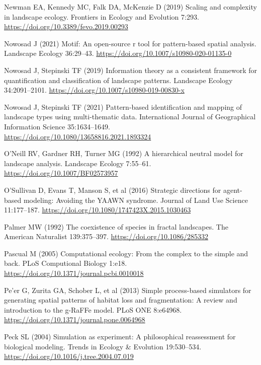 \documentclass[
  10pt,
  a4paperpaper,
]{article}
\newlength{\cslhangindent}
\newenvironment{CSLReferences}[2] %
 {\begin{list}{}{%
  \setlength{\itemindent}{0pt}
  \setlength{\leftmargin}{0pt}
  \setlength{\parsep}{0pt}
  \ifodd #1
   \setlength{\leftmargin}{\cslhangindent}
   \setlength{\itemindent}{-1\cslhangindent}
  \fi
  \setlength{\itemsep}{#2\baselineskip}}}
 {\end{list}}
\begin{document}
\begin{CSLReferences}{1}{1}
Newman EA, Kennedy MC, Falk DA, McKenzie D (2019) Scaling and complexity
in landscape ecology. Frontiers in Ecology and Evolution 7:293.
\url{https://doi.org/10.3389/fevo.2019.00293}

Nowosad J (2021) Motif: An open-source r tool for pattern-based spatial
analysis. Landscape Ecology 36:29--43.
\url{https://doi.org/10.1007/s10980-020-01135-0}

Nowosad J, Stepinski TF (2019) Information theory as a consistent
framework for quantification and classification of landscape patterns.
Landscape Ecology 34:2091--2101.
\url{https://doi.org/10.1007/s10980-019-00830-x}

Nowosad J, Stepinski TF (2021) Pattern-based identification and mapping
of landscape types using multi-thematic data. International Journal of
Geographical Information Science 35:1634--1649.
\url{https://doi.org/10.1080/13658816.2021.1893324}

O'Neill RV, Gardner RH, Turner MG (1992) A hierarchical neutral model
for landscape analysis. Landscape Ecology 7:55--61.
\url{https://doi.org/10.1007/BF02573957}

O'Sullivan D, Evans T, Manson S, et al (2016) Strategic directions for
agent-based modeling: Avoiding the YAAWN syndrome. Journal of Land Use
Science 11:177--187. \url{https://doi.org/10.1080/1747423X.2015.1030463}

Palmer MW (1992) The coexistence of species in fractal landscapes. The
American Naturalist 139:375--397. \url{https://doi.org/10.1086/285332}

Pascual M (2005) Computational ecology: From the complex to the simple
and back. PLoS Computional Biology 1:e18.
\url{https://doi.org/10.1371/journal.pcbi.0010018}

Pe'er G, Zurita GA, Schober L, et al (2013) Simple process-based
simulators for generating spatial patterns of habitat loss and
fragmentation: A review and introduction to the g-RaFFe model. PLoS ONE
8:e64968. \url{https://doi.org/10.1371/journal.pone.0064968}

Peck SL (2004) Simulation as experiment: A philosophical reassessment
for biological modeling. Trends in Ecology \& Evolution 19:530--534.
\url{https://doi.org/10.1016/j.tree.2004.07.019}


\end{CSLReferences}
\end{document}
